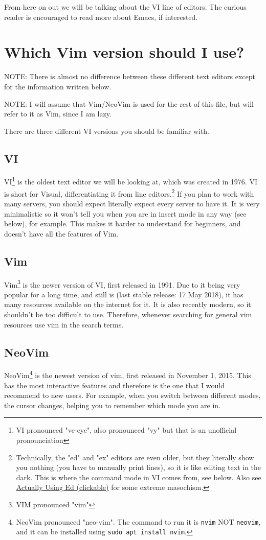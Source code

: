 \documentclass[11pt]{article}
\begin{document}
From here on out we will be talking about the VI line of editors. The curious
reader is encouraged to read more about Emacs, if interested.
\section{Which Vim version should I use?}
\label{sec:org063c584}
NOTE: There is almost no difference between these different text editors except
for the information written below.

NOTE: I will assume that Vim/NeoVim is used for the rest of this file, but will
refer to it as Vim, since I am lazy.

There are three different VI versions you should be familiar with.
\subsection{VI}
\label{sec:orgb37d2d2}
VI\footnote{VI pronounced "ve-eye", also pronounced "vy" but that is an unofficial pronounciation} is the oldest text editor we will be looking at, which was created
in 1976. VI is short for Visual, differentiating it from line editors.\footnote{Technically, the "ed" and "ex" editors are even older, but they literally
show you nothing (you have to manually print lines), so it is like editing text
in the dark. This is where the command mode in VI comes from, see below. Also see
\href{https://sanctum.geek.nz/arabesque/actually-using-ed/}{Actually Using Ed (clickable)} for some extreme masochism.} If
you plan to work with many servers, you should expect literally expect every
server to have it. It is very minimalistic so it won't tell you when you are in
insert mode in any way (see below), for example. This makes it harder to
understand for beginners, and doesn't have all the features of Vim.
\subsection{Vim}
\label{sec:orgfb4037a}
Vim\footnote{VIM pronounced "vim"} is the newer version of VI, first released in 1991. Due to it being
very popular for a long time, and still is (last stable release: 17 May 2018),
it has many resources available on the internet for it. It is also recently
modern, so it shouldn't be too difficult to use. Therefore, whenever searching
for general vim resources use vim in the search terms.
\subsection{NeoVim}
\label{sec:org4784124}
NeoVim\footnote{NeoVim pronounced "neo-vim". The command to run it is \texttt{nvim} NOT \texttt{neovim}, and
it can be installed using \texttt{sudo apt install nvim}.} is the newest version of vim, first released in November 1, 2015.
This has the most interactive features and therefore is the one that I would
recommend to new users. For example, when you switch between different modes,
the cursor changes, helping you to remember which mode you are in.
\end{document}
